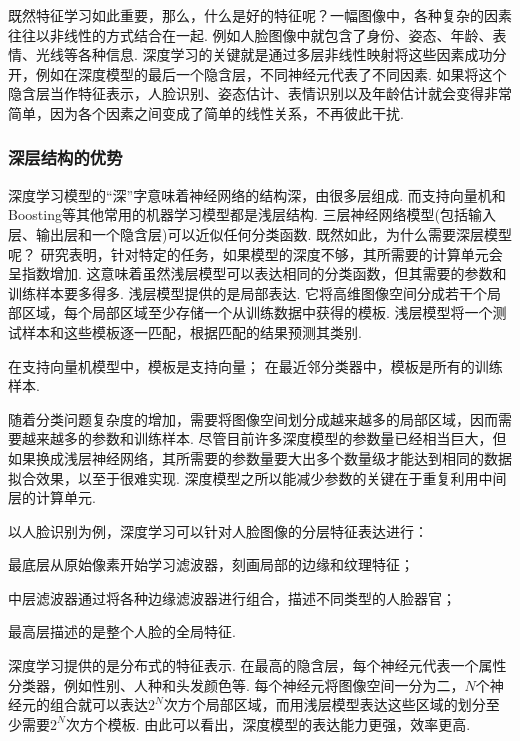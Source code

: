 既然特征学习如此重要，那么，什么是好的特征呢？一幅图像中，各种复杂的因素往往以非线性的方式结合在一起.
例如人脸图像中就包含了身份、姿态、年龄、表情、光线等各种信息.
深度学习的关键就是通过多层非线性映射将这些因素成功分开，例如在深度模型的最后一个隐含层，不同神经元代表了不同因素.
如果将这个隐含层当作特征表示，人脸识别、姿态估计、表情识别以及年龄估计就会变得非常简单，因为各个因素之间变成了简单的线性关系，不再彼此干扰.
\subsubsection{深层结构的优势}
深度学习模型的“深”字意味着神经网络的结构深，由很多层组成. 而支持向量机和Boosting等其他常用的机器学习模型都是浅层结构.
三层神经网络模型(包括输入层、输出层和一个隐含层)可以近似任何分类函数. 既然如此，为什么需要深层模型呢？
研究表明，针对特定的任务，如果模型的深度不够，其所需要的计算单元会呈指数增加. 这意味着虽然浅层模型可以表达相同的分类函数，但其需要的参数和训练样本要多得多.
浅层模型提供的是局部表达. 它将高维图像空间分成若干个局部区域，每个局部区域至少存储一个从训练数据中获得的模板.
浅层模型将一个测试样本和这些模板逐一匹配，根据匹配的结果预测其类别.
\begin{example}
    在支持向量机模型中，模板是支持向量；
在最近邻分类器中，模板是所有的训练样本.
\end{example}

随着分类问题复杂度的增加，需要将图像空间划分成越来越多的局部区域，因而需要越来越多的参数和训练样本.
尽管目前许多深度模型的参数量已经相当巨大，但如果换成浅层神经网络，其所需要的参数量要大出多个数量级才能达到相同的数据拟合效果，以至于很难实现.
深度模型之所以能减少参数的关键在于重复利用中间层的计算单元.

\begin{example}
以人脸识别为例，深度学习可以针对人脸图像的分层特征表达进行：

\qquad{} 最底层从原始像素开始学习滤波器，刻画局部的边缘和纹理特征；

\qquad{} 中层滤波器通过将各种边缘滤波器进行组合，描述不同类型的人脸器官；

\qquad{} 最高层描述的是整个人脸的全局特征.

深度学习提供的是分布式的特征表示.
在最高的隐含层，每个神经元代表一个属性分类器，例如性别、人种和头发颜色等.
每个神经元将图像空间一分为二，$N$个神经元的组合就可以表达$2^N$次方个局部区域，而用浅层模型表达这些区域的划分至少需要$2^N$次方个模板.
由此可以看出，深度模型的表达能力更强，效率更高.
\end{example}
